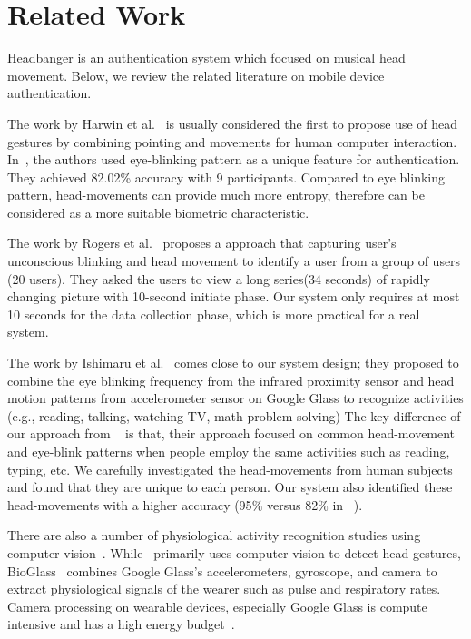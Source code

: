\section{Related Work}\label{sec:related}
Headbanger is an authentication system which focused on musical head movement. Below, we review the related literature on mobile device authentication.


The work by Harwin et al.~\cite{harwin1990analysis} is usually considered the 
first to propose use of head gestures by combining pointing and movements
for human computer interaction. 
In~\cite{westeyn2004recognizing}, the authors used 
eye-blinking pattern as a unique feature for
authentication. They achieved 82.02\% accuracy with 9 participants. Compared 
to eye blinking pattern, head-movements can provide much more entropy, 
therefore can be considered as a more suitable biometric characteristic.

The work by Rogers et al.~\cite{rogers2015approach} proposes a approach that capturing user's unconscious blinking and head movement to identify a user from a group of users (20 users). They asked the users to view a long series(34 seconds) of rapidly changing picture with 10-second initiate phase. Our system only requires at most 10 seconds for the  data collection phase, which is more practical for a real system. 
 
The work by Ishimaru et al.~\cite{ishimaru2014blink} comes close to our system 
design; they proposed to combine the eye blinking frequency from the infrared 
proximity sensor and head motion patterns from accelerometer sensor on Google 
Glass to recognize activities (e.g., reading, talking, watching TV,
math problem solving) 
The key difference of our approach from ~\cite{ishimaru2014blink} is 
that, their approach focused on common head-movement and eye-blink patterns 
when people employ the same activities such as reading, typing, etc. 
We carefully investigated the head-movements from human subjects and found 
that they are unique to each person. 
Our system also identified these head-movements with a higher accuracy (95$\%$ 
versus 82$\%$ in ~\cite{ishimaru2014blink}).

There are also a number of physiological activity recognition studies 
using computer vision~\cite{kjeldsen2001head,hernandezbioglass}. 
While~\cite{kjeldsen2001head} primarily uses computer vision to detect 
head gestures, BioGlass~\cite{hernandezbioglass}
combines Google Glass's accelerometers, gyroscope, and camera to
extract physiological signals of the wearer such as pulse
and respiratory rates. Camera processing on wearable devices, especially 
Google Glass is compute intensive and has a high energy 
budget~\cite{likamwa2014draining}.

